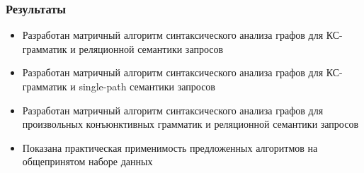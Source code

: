 \documentclass{beamer}
\begin{document}
\begin{frame}[fragile]
	\transwipe[direction=90]
	\frametitle{Результаты}
	\begin{itemize}
		\item Разработан матричный алгоритм синтаксического анализа графов для КС-грамматик и реляционной семантики запросов
		\item Разработан матричный алгоритм синтаксического анализа графов для КС-грамматик и single-path семантики запросов
		\item Разработан матричный алгоритм синтаксического анализа графов для произвольных конъюнктивных грамматик и реляционной семантики запросов
		\item Показана практическая применимость предложенных алгоритмов на общепринятом наборе данных
	\end{itemize}
\end{frame}
\end{document}
